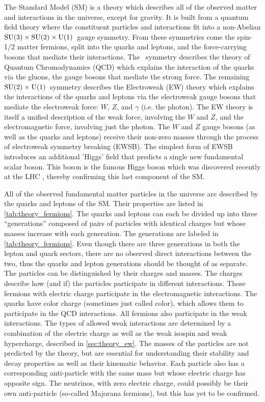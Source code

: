 The Standard Model (SM) is a theory which describes all of the
observed matter and interactions in the universe, except for gravity.
It is built from a quantum field theory where the constituent particles
and interactions fit into a non-Abelian 
$\textrm{SU(3)}\times\textrm{SU(2)}\times\textrm{U(1)}$~gauge symmetry.
From these symmetries come the spin-1/2 matter fermions, split 
into the quarks and leptons, and the force-carrying bosons
that mediate their interactions.
The \suthree~symmetry describes the theory of Quantum Chromodynamics (QCD)
which explains the interaction of the quarks via the gluons, the
gauge bosons that mediate the strong force.
The remaining $\textrm{SU(2)}\times\textrm{U(1)}$~symmetry 
describes the Electroweak (EW) theory which explains
the interactions of the quarks and leptons via the 
electroweak gauge bosons that mediate
the electroweak force: $W$, $Z$, and $\gamma$ (i.e. the photon).
The EW theory is itself a unified description of the weak force,
involving the $W$ and $Z$, and the electromagnetic force, involving
just the photon.
The $W$ and $Z$ gauge bosons (as well as the quarks and leptons) receive
their non-zero masses through the process of electroweak symmetry
breaking (EWSB). The simplest form of EWSB
introduces an additional 'Higgs' field that
predicts a single new fundamental scalar boson. This boson is the
famous Higgs boson which was discovered recently at the 
LHC \cite{Aad20121,Chatrchyan:2012xdj}, thereby
confirming this last component of the SM.

All of the 
observed fundamental 
matter particles in the universe are described by the quarks
and leptons of the SM. Their properties are listed 
in \tab\ref{tab:theory_fermions}. 
The quarks and leptons can each be divided up into three ``generations'' 
composed of pairs
of particles with identical charges but whose masses increase with each generation.
The generations are labeled in \tab\ref{tab:theory_fermions}. 
Even though there are three 
generations in both the lepton and quark sectors, 
there are no observed direct interactions between the two, 
thus the quarks and lepton generations should be thought of as separate.
The particles can be distinguished
by their charges and masses.
The charges describe how (and if) the particles participate in
different interactions.
Those fermions with electric charge 
participate in the electromagnetic
interactions. The quarks have color charge (sometimes 
just called color), which allows them to 
participate in the QCD interactions. All fermions also participate in 
the weak interactions. The types of allowed weak interactions are determined
by a combination of the electric charge as well as the weak isospin
and weak hypercharge, described in \sec\ref{sec:theory_ew}.
The masses of the particles are not predicted by the theory, but 
are essential for understanding their stability and decay properties
as well as their kinematic behavior.
Each particle also has a corresponding anti-particle with the same mass but
whose electric charge has opposite sign. The neutrinos, with zero 
electric charge, could possibly be their own 
anti-particle (so-called Majorana fermions), but
this has yet to be confirmed.

